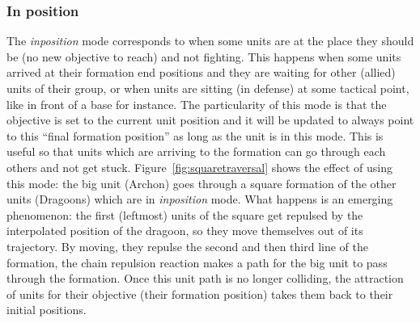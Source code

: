 \subsubsection{In position}

The \textit{inposition} mode corresponds to when some units are at the place they should be (no new objective to reach) and not fighting. This happens when some units arrived at their formation end positions and they are waiting for other (allied) units of their group, or when units are sitting (in defense) at some tactical point, like in front of a base for instance. The particularity of this mode is that the objective is set to the current unit position and it will be updated to always point to this ``final formation position'' as long as the unit is in this mode. This is useful so that units which are arriving to the formation can go through each others and not get stuck. Figure~\ref{fig:squaretraversal} shows the effect of using this mode: the big unit (Archon) goes through a square formation of the other units (Dragoons) which are in \textit{inposition} mode. What happens is an emerging phenomenon: the first (leftmost) units of the square get repulsed by the interpolated position of the dragoon, so they move themselves out of its trajectory. By moving, they repulse the second and then third line of the formation, the chain repulsion reaction makes a path for the big unit to pass through the formation. Once this unit path is no longer colliding, the attraction of units for their objective (their formation position) takes them back to their initial positions.

